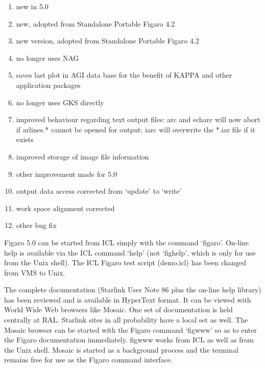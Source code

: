 
\begin{enumerate}
\item new in 5.0                                                 %
\item new, adopted from Standalone Portable Figaro 4.2           %
\item new version, adopted from Standalone Portable Figaro 4.2   %
\item no longer uses NAG                                         %
\item saves last plot in AGI data base for the benefit of        %
   KAPPA and other application packages
\item no longer uses GKS directly                                %
\item improved behaviour regarding text output files:            %
   arc and echarc will now abort if arlines.* cannot be opened for
   output; iarc will overwrite the *.iar file if it exists
\item improved storage of image file information                 %
\item other improvement made for 5.0                             %
\item output data access corrected from `update' to `write'      %
\item work space alignment corrected                             %
\item other bug fix                                              %
\end{enumerate}


   Figaro 5.0 can be started from ICL simply with the command `figaro'.
   On-line help is available via the ICL command `help' (not `fighelp',
   which is only for use from the Unix shell). The ICL Figaro test
   script (demo.icl) has been changed from VMS to Unix.


   The complete documentation (Starlink User Note 86 plus the on-line
   help library) has been reviewed and is available in
   HyperText format. It can be viewed with World Wide Web browsers like
   Mosaic. One set of documentation is held centrally at RAL. Starlink
   sites in all probability have a local set as well. The Mosaic browser
   can be started with the Figaro command `figwww' so as to enter the
   Figaro documentation immediately. figwww works from ICL as well as
   from the Unix shell. Mosaic is started as a background process and
   the terminal remains free for use as the Figaro command interface.

